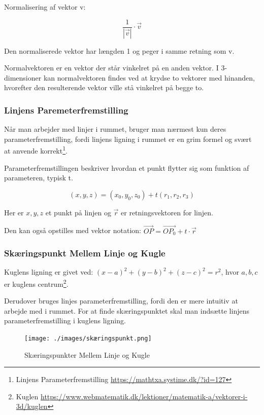 \documentclass{article}
\begin{document}
\begin{flushleft}
    Normalisering af vektor v:

    \[\frac{1}{|\vec{v}|} \cdot \vec{v} \]

    Den normaliserede vektor har længden 1 og peger i samme retning som v.

    Normalvektoren er en vektor der står vinkelret på en anden vektor.
    I 3-dimensioner kan normalvektoren findes ved at krydse to vektorer med hinanden,
    hvorefter den resulterende vektor ville stå vinkelret på begge to.

    \subsubsection{Linjens Paremeterfremstilling}

    Når man arbejder med linjer i rummet, bruger man nærmest kun deres parameterfremstilling,
    fordi linjens ligning i rummet er en grim formel og svært at anvende korrekt\footnote{Linjens Parameterfremstilling \url{https://mathtxa.systime.dk/?id=127}}.

    Parameterfremstillingen beskriver hvordan et punkt flytter sig som funktion af parameteren, typisk t.

    \[(x, y, z) = (x_0, y_0, z_0) + t(r_1, r_2, r_3)\]

    Her er \(x, y, z\) et punkt på linjen og \(\vec{r}\) er retningsvektoren for linjen.

    Den kan også opstilles med vektor notation: \(\overrightarrow{OP} = \overrightarrow{OP_0} + t \cdot \vec{r}\)

    \subsubsection{Skæringspunkt Mellem Linje og Kugle}

    Kuglens ligning er givet ved: \((x-a)^2 + (y-b)^2 + (z-c)^2 = r^2\),
    hvor \(a, b, c\) er kuglens centrum\footnote{Kuglen \url{https://www.webmatematik.dk/lektioner/matematik-a/vektorer-i-3d/kuglen}}.

    Derudover bruges linjes parameterfremstilling, fordi den er mere intuitiv at arbejde med i rummet.
    For at finde skæringspunktet skal man indsætte linjens parameterfremstilling i kuglens ligning.

    \begin{figure}
        \centering
        \texttt{[image: ./images/skæringspunkt.png]}
        \caption{Skæringspunkter Mellem Linje og Kugle}
    \end{figure}


\end{flushleft}
\end{document}
